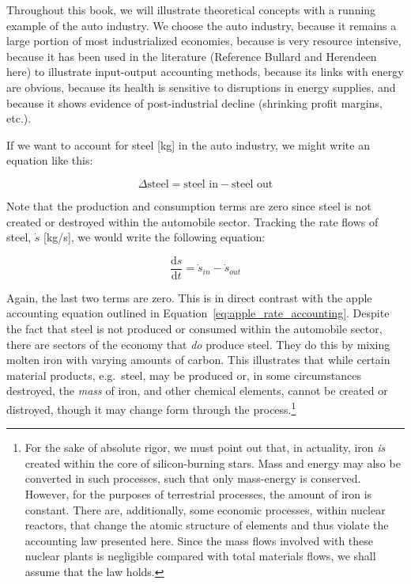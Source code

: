 
Throughout this book, we will illustrate theoretical concepts with
a running example of the auto industry. We choose the auto industry,
because it remains a large portion of most industrialized economies, 
because is very resource intensive,
because it has been used in the literature (Reference Bullard and Herendeen here)
to illustrate input-output accounting methods, 
because its links with energy are obvious,
because its health is sensitive to disruptions in energy supplies, and
because it shows evidence of post-industrial decline (shrinking profit margins, etc.).

If we want to account for steel [kg] in the auto industry, 
we might write an equation like this:

\begin{equation}
	\Delta\textrm{steel} 
	= \textrm{steel in} 
	- \textrm{steel out} 
\end{equation}

Note that the production and consumption terms are zero
since steel is not created or destroyed within the automobile
sector. Tracking the rate flows of steel, 
$\dot{s}$ [kg/s],
we would write the following equation:

\begin{equation}
	\frac{\mathrm{d}s}{\mathrm{d}t}
	= \dot{s}_{in}
	- \dot{s}_{out}
\end{equation}

Again, the last two terms are zero. This is in direct contrast with the apple 
accounting equation outlined in Equation~\ref{eq:apple_rate_accounting}. Despite 
the fact that steel is not produced or consumed within the automobile sector, 
there are sectors of the economy that \emph{do} produce steel. They do this by mixing molten
iron with varying amounts of carbon. This illustrates that while certain material
products, e.g.\ steel, may be produced or, in some circumstances destroyed, the
\emph{mass} of iron, and other chemical elements, cannot be created or distroyed,
though it may change form through the process.\footnote{For the sake of
absolute rigor, we must point out that, in actuality, iron \emph{is} created within
the core of silicon-burning stars. Mass and energy may also be converted in such processes, 
such that only mass-energy is conserved. However, for the purposes of terrestrial
processes, the amount of iron is constant. There are, additionally, some economic
processes, within nuclear reactors, that change the atomic structure of elements
and thus violate the accounting law presented here. Since the mass flows involved
with these nuclear plants is negligible compared with total materials flows, we
shall assume that the law holds.} 

